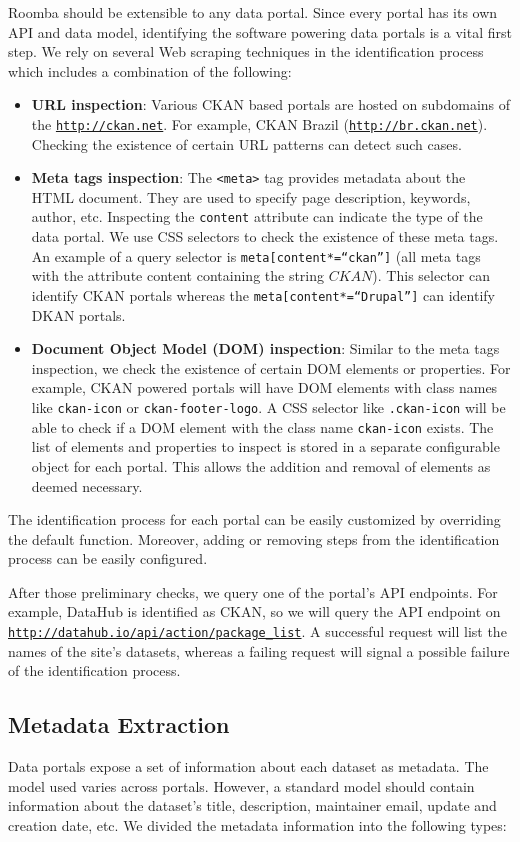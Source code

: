 \documentclass[runningheads,a4paper]{llncs}
\begin{document}
Roomba should be extensible to any data portal. Since every portal has its own API and data model, identifying the software powering data portals is a vital first step. We rely on several Web scraping techniques in the identification process which includes a combination of the following:
\begin{itemize}
  \item \textbf{URL inspection}: Various CKAN based portals are hosted on subdomains of the \texttt{\url{http://ckan.net}}. For example, CKAN Brazil (\texttt{\url{http://br.ckan.net}}). Checking the existence of certain URL patterns can detect such cases.
  \item \textbf{Meta tags inspection}: The \texttt{<meta>} tag provides metadata about the HTML document. They are used to specify page description, keywords, author, etc. Inspecting the \texttt{content} attribute can indicate the type of the data portal. We use CSS selectors to check the existence of these meta tags. An example of a query selector is \texttt{meta[content*=``ckan'']} (all meta tags with the attribute content containing the string $CKAN$). This selector can identify CKAN portals whereas the \texttt{meta[content*=``Drupal'']} can identify DKAN portals.
  \item \textbf{Document Object Model (DOM) inspection}: Similar to the meta tags inspection, we check the existence of certain DOM elements or properties. For example, CKAN powered portals will have DOM elements with class names like \texttt{ckan-icon} or \texttt{ckan-footer-logo}. A CSS selector like \texttt{.ckan-icon} will be able to check if a DOM element with the class name \texttt{ckan-icon} exists.
  The list of elements and properties to inspect is stored in a separate configurable object for each portal. This allows the addition and removal of elements as deemed necessary.
\end{itemize}
The identification process for each portal can be easily customized by overriding the default function. Moreover, adding or removing steps from the identification process can be easily configured.

After those preliminary checks, we query one of the portal's API endpoints. For example, DataHub is identified as CKAN, so we will query the API endpoint on \texttt{\url{http://datahub.io/api/action/package\_list}}. A successful request will list the names of the site's datasets, whereas a failing request will signal a possible failure of the identification process.

\subsection{Metadata Extraction}
Data portals expose a set of information about each dataset as metadata. The model used varies across portals. However, a standard model should contain information about the dataset's title, description, maintainer email, update and creation date, etc. We divided the metadata information into the following types:
\end{document}
